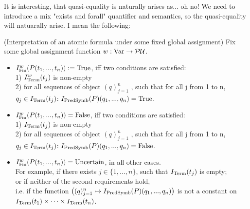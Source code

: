 It is interesting, that quasi-equality is naturally arises as... oh no!
We need to introduce a mix "exists and forall" quantifier and semantics, so the quasi-equality will natuarally arise.
I mean the following:


\begin{definition}(Interpretation of an atomic formula under some fixed global assignment)
Fix some global assignment function $w:\mathrm{Var}\to\mathcal{P}\mathcal{U}$.\\


\begin{itemize}
\item
$I_{\mathrm{Fm}}^w(P(t_1,...,t_n)):=\mathrm{True}$, iff two conditions are satisfied:\\
1) $I^w_{\mathrm{Term}}(t_j)$ is non-empty\\
2) for all sequences of object $(q)_{j=1}^n$ , such that for all j from 1 to n, $q_j\in I_{\mathrm{Term}}(t_j)$: $I_{\mathrm{PredSymb}}(P)(q_1,...,q_n)=\mathrm{True}$.
\item $I_{\mathrm{Fm}}^w(P(t_1,...,t_n))=\mathrm{False}$, iff two conditions are satisfied:\\
1) $I_{\mathrm{Term}}(t_j)$ is non-empty\\
2) for all sequences of object $(q)_{j=1}^n$ , such that for all j from 1 to n, $q_j\in I_{\mathrm{Term}}(t_j)$: $I_{\mathrm{PredSymb}}(P)(q_1,...,q_n)=\mathrm{False}$.
\item
$I_{\mathrm{Fm}}^w(P(t_1,...,t_n))=\mathrm{Uncertain}$, in all other cases.\\
For example, if there exists $j\in\{1,...,n\}$, such that $I_{\mathrm{Term}}(t_j)$ is empty;\\
or if neither of the second requirements hold,\\
i.e. if the function $\left((q)_{j=1}^n \mapsto I_{\mathrm{PredSymb}}(P)(q_1,...,q_n)\right)$ is not a constant on $I_{\mathrm{Term}}(t_1)\times\dots\times I_{\mathrm{Term}}(t_n)$.
\end{itemize}
\end{definition}





